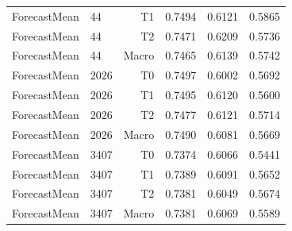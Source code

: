 \begin{table}[t]
\begin{tabular}{llrrrr}
ForecastMean & 44 & T1 & 0.7494 & 0.6121 & 0.5865 \\
ForecastMean & 44 & T2 & 0.7471 & 0.6209 & 0.5736 \\
ForecastMean & 44 & Macro & 0.7465 & 0.6139 & 0.5742 \\
ForecastMean & 2026 & T0 & 0.7497 & 0.6002 & 0.5692 \\
ForecastMean & 2026 & T1 & 0.7495 & 0.6120 & 0.5600 \\
ForecastMean & 2026 & T2 & 0.7477 & 0.6121 & 0.5714 \\
ForecastMean & 2026 & Macro & 0.7490 & 0.6081 & 0.5669 \\
ForecastMean & 3407 & T0 & 0.7374 & 0.6066 & 0.5441 \\
ForecastMean & 3407 & T1 & 0.7389 & 0.6091 & 0.5652 \\
ForecastMean & 3407 & T2 & 0.7381 & 0.6049 & 0.5674 \\
ForecastMean & 3407 & Macro & 0.7381 & 0.6069 & 0.5589 \\
\bottomrule
\end{tabular}
\end{table}
